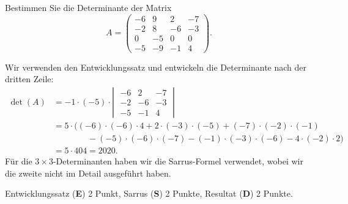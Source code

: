 Bestimmen Sie die Determinante der Matrix
\[
A=\begin{pmatrix}
  -6&  9&  2& -7\\
  -2&  8& -6& -3\\
   0& -5&  0&  0\\
  -5& -9& -1&  4
\end{pmatrix}.
\]


\begin{loesung}
Wir verwenden den Entwicklungssatz und entwickeln die Determinante nach der
dritten Zeile:
\begin{align*}
\det(A)
&=
-1\cdot(-5)\cdot \left|\;\begin{matrix}
  -6&  2& -7\\
  -2& -6& -3\\
  -5& -1&  4
\end{matrix}\;\right|
\\
&=
5\cdot\bigl(
(-6)\cdot(-6)\cdot 4 + 2\cdot(-3)\cdot(-5)+(-7)\cdot(-2)\cdot(-1)
\\
&\qquad\qquad
- (-5)\cdot(-6)\cdot(-7) - (-1)\cdot(-3)\cdot(-6) - 4\cdot(-2)\cdot 2
\bigr)
\\
&=
5\cdot 404
=
2020.
\end{align*}
Für die $3\times 3$-Determinanten haben wir die Sarrus-Formel verwendet, wobei
wir die zweite nicht im Detail ausgeführt haben.
\end{loesung}

\begin{bewertung}
Entwicklungssatz ({\bf E}) 2 Punkt,
Sarrus ({\bf S}) 2 Punkte,
Resultat ({\bf D}) 2 Punkte.
\end{bewertung}


